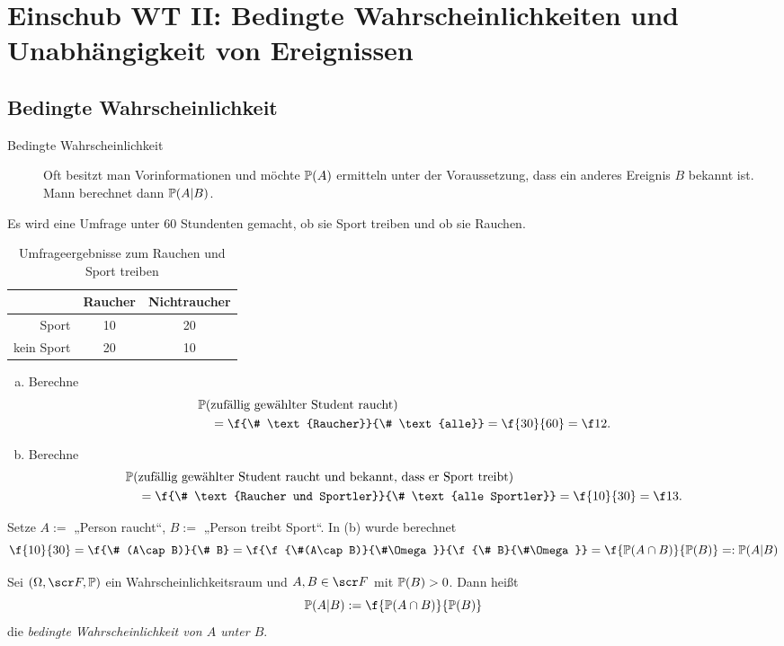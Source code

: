 \section{Einschub WT II: Bedingte Wahrscheinlichkeiten und Unabhängigkeit von Ereignissen}


\subsection{Bedingte Wahrscheinlichkeit}

\begin{description}
	\item[Bedingte Wahrscheinlichkeit]
		Oft besitzt man Vorinformationen und möchte $\P(A)$ ermitteln unter der Voraussetzung, dass ein anderes Ereignis $B$ bekannt ist.
		Mann berechnet dann $\P(A|B)$.
\end{description}

\begin{ex} \label{1.5.1}
	Es wird eine Umfrage unter 60 Stundenten gemacht, ob sie Sport treiben und ob sie Rauchen.
	\begin{table}[H]
		\centering
		\caption{Umfrageergebnisse zum Rauchen und Sport treiben}
		\begin{tabular}{r|cc}
			& Raucher & Nichtraucher \\\hline
			Sport & 10 & 20 \\
			kein Sport & 20 & 10
		\end{tabular}
	\end{table}
	\begin{enumerate}[(a)]
		\item
			Berechne
			\begin{align*}
				&\P(\text{zufällig gewählter Student raucht}) \\
				&\quad= \f {\# \text{Raucher}}{\# \text{alle}}
				= \f {30}{60}
				= \f 12.
			\end{align*}
		\item
			Berechne
			\begin{align*}
				&\P(\text{zufällig gewählter Student raucht und bekannt, dass er Sport treibt}) \\
				&\quad= \f {\# \text{Raucher und Sportler}}{\# \text{alle Sportler}}
				= \f {10}{30}
				= \f 13.
			\end{align*}
	\end{enumerate}
	Setze $A := $ „Person raucht“, $B := $ „Person treibt Sport“.
	In (b) wurde berechnet
	\[
		\f {10}{30}
		= \f {\# (A\cap B)}{\# B}
		= \f {\f{\#(A\cap B)}{\#\Omega}}{\f {\# B}{\#\Omega}}
		= \f {\P(A \cap B)}{\P(B)}
		=: \P(A|B)
	\]
\end{ex}

\begin{df} \label{1.5.2}
	Sei $(\Omega, \scr F, \P)$ ein Wahrscheinlichkeitsraum und $A,B \in \scr F$ mit $\P(B) > 0$.
	Dann heißt
	\[
		\P(A | B) := \f {\P(A\cap B)}{\P(B)}
	\]
	die \emph{bedingte Wahrscheinlichkeit von $A$ unter $B$}.
\end{df}

